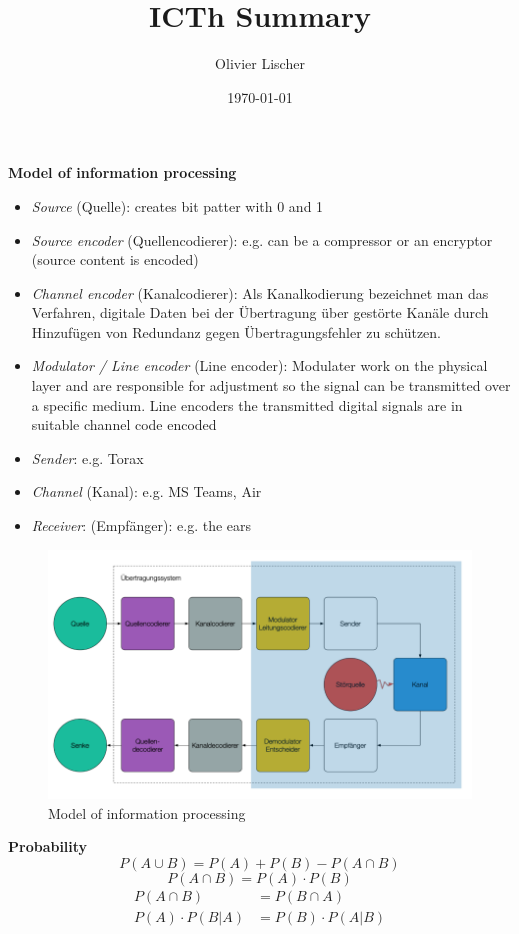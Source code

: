 \documentclass[11pt,twoside,twocolumn,landscape]{article}
\author{Olivier Lischer}
\date{\today}
\title{ICTh Summary}
\begin{document}
\pagestyle{fancy}
\fancyhf{}
\fancyfoot[CE,CO]{\leftmark}
\fancyfoot[R]{\thepage}

\textbf{Model of information processing}

\begin{itemize}
\item \emph{Source} (Quelle): creates bit patter with 0 and 1
\item \emph{Source encoder} (Quellencodierer): e.g. can be a compressor or an encryptor (source content is encoded)
\item \emph{Channel encoder} (Kanalcodierer): 
Als Kanalkodierung bezeichnet man das Verfahren, digitale Daten bei der Übertragung über gestörte Kanäle durch Hinzufügen von Redundanz gegen Übertragungsfehler zu schützen.
\item \emph{Modulator / Line encoder} (Line encoder): Modulater work on the physical layer and are responsible for adjustment so the signal can be transmitted over a specific medium. Line encoders the transmitted digital signals are in suitable channel code encoded
\item \emph{Sender}: e.g. Torax
\item \emph{Channel} (Kanal): e.g. MS Teams, Air
\item \emph{Receiver}: (Empfänger): e.g. the ears
\end{itemize}

\begin{figure}[htbp]
\centering
\includegraphics[width=.9\linewidth]{img/modell_der_informationsverarbeitung.png}
\caption{\label{fig:org7342fc8}Model of information processing}
\end{figure}

\textbf{Probability}
\begin{equation}
P(A \cup B) = P(A) + P(B) - P(A \cap B)
\end{equation}
\begin{equation}
P(A \cap B) = P(A) \cdot P(B)
\end{equation}
\begin{align}
P(A \cap B) &= P(B \cap A) \\
P(A) \cdot P(B|A) &= P(B) \cdot P(A|B)
\end{align}
\end{document}
